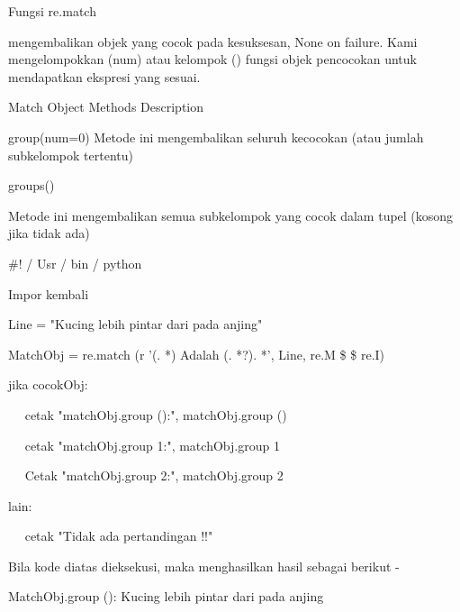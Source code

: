 \vspace{12pt}
\vspace{12pt}
\noindent 
Fungsi re.match  \par
\noindent 
mengembalikan objek yang cocok pada kesuksesan, None on failure. Kami mengelompokkan (num) atau kelompok () fungsi objek pencocokan untuk mendapatkan ekspresi yang sesuai. \par
\noindent 
Match Object Methods \hspace*{0.5in} Description \par
\noindent 
group(num=0) \hspace*{0.5in} Metode ini mengembalikan seluruh kecocokan (atau jumlah subkelompok tertentu) \par
\vspace{12pt}
groups() \hspace*{0.5in}  \par
\noindent 
Metode ini mengembalikan semua subkelompok yang cocok dalam tupel (kosong jika tidak ada) \par
\vspace{12pt}
\vspace{12pt}
\noindent 
 $  \#  $! / Usr / bin / python \par
\noindent 
Impor kembali \par
\vspace{12pt}
\noindent 
Line = "Kucing lebih pintar dari pada anjing" \par
\vspace{12pt}
\noindent 
MatchObj = re.match (r '(. *) Adalah (. *?). *', Line, re.M  \$  \vert  \$ re.I) \par
\vspace{12pt}
\noindent 
jika cocokObj: \par
\noindent 
~~ cetak "matchObj.group ():", matchObj.group () \par
\noindent 
~~ cetak "matchObj.group {1}:", matchObj.group {1} \par
\noindent 
~~ Cetak "matchObj.group {2}:", matchObj.group {2} \par
\noindent 
lain: \par
\noindent 
~~ cetak "Tidak ada pertandingan !!" \par
\vspace{12pt}
\noindent 
Bila kode diatas dieksekusi, maka menghasilkan hasil sebagai berikut - \par
\vspace{12pt}
\noindent 
MatchObj.group (): Kucing lebih pintar dari pada anjing \par
